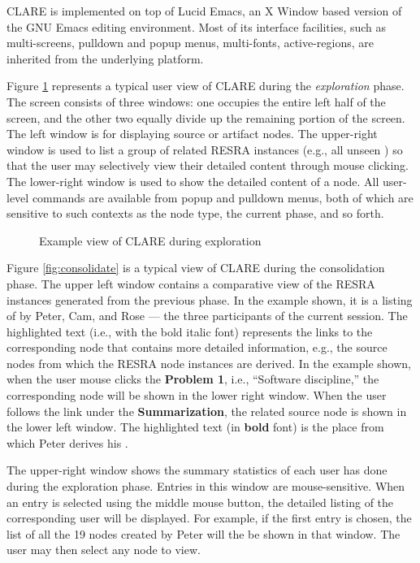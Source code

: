 CLARE is implemented on top of Lucid Emacs, an X Window based version of
the GNU Emacs editing environment. Most of its interface facilities, such
as multi-screens, pulldown and popup menus, multi-fonts, active-regions,
are inherited from the underlying platform.

Figure \ref{fig:explore} represents a typical user view of CLARE during the
{\it exploration\/} phase. The screen consists of three windows: one
occupies the entire left half of the screen, and the other two equally
divide up the remaining portion of the screen. The left window is for
displaying source or artifact nodes. The upper-right window is used to list
a group of related RESRA instances (e.g., all unseen )
so that the user may selectively view their detailed content through mouse
clicking. The lower-right window is used to show the detailed content of a
node.  All user-level commands are available from popup and pulldown menus,
both of which are sensitive to such contexts as the node type, the current
phase, and so forth.

\begin{figure}[htb]
  \centerline{}
  \caption{Example view of CLARE during exploration}
  \label{fig:explore}
\end{figure}

Figure \ref{fig:consolidate} is a typical view of CLARE during the
consolidation phase. The upper left window contains a comparative view of
the RESRA instances generated from the previous phase. In the example
shown, it is a listing of  by Peter, Cam, and Rose
 --- the three participants of the current session.  The highlighted text
(i.e., with the bold italic font) represents the links to the corresponding
node that contains more detailed information, e.g., the source nodes from
which the RESRA node instances are derived. In the example shown, when the
user mouse clicks the {\bf Problem 1}, i.e., ``Software discipline,'' the
corresponding node will be shown in the lower right window. When the user
follows the link under the {\bf Summarization\/}, the related source node
is shown in the lower left window. The highlighted text (in {\bf bold}
font) is the place from which Peter derives his .

The upper-right window shows the summary statistics of each user has done
during the exploration phase. Entries in this window are
mouse-sensitive. When an entry is selected using the middle mouse button,
the detailed listing of the corresponding user will be displayed. For
example, if the first entry is chosen, the list of all the 19 nodes created
by Peter will the be shown in that window. The user may then select any
node to view.


